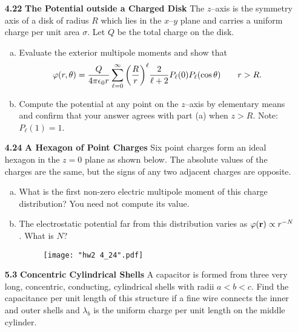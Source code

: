 \documentclass{article}
\begin{document}
\begin{enumerate}
    \item [\textbf{4.22}] \textbf{The Potential outside a Charged Disk } The $z$--axis is the symmetry axis of a disk of radius $R$ which lies in the $x$--$y$ plane and carries a uniform charge per unit area $\sigma$. Let $Q$ be the total charge on the disk.
    \begin{enumerate}[(a)]
        \item Evaluate the exterior multipole moments and show that
        \[
            \varphi(r,\theta) = \frac{Q}{4\pi\epsilon_0r}\sum_{\ell=0}^\infty \pqty{\frac{R}{r}}^\ell \frac{2}{\ell+2}P_\ell(0)P_\ell(\cos\theta)\quad\quad r>R.
        \]

        \item Compute the potential at any point on the $z$--axis by elementary means and confirm that your answer agrees with part (a) when $z>R$. Note: $P_\ell(1)=1$.
    \end{enumerate}

    \item [\textbf{4.24}] \textbf{A Hexagon of Point Charges } Six point charges form an ideal hexagon in the $z=0$ plane as shown below. The absolute values of the charges are the same, but the signs of any two adjacent charges are opposite.
    \begin{enumerate}[(a)]
        \item What is the first non-zero electric multipole moment of this charge distribution? You need not compute its value.

        \item The electrostatic potential far from this distribution varies as $\varphi(\vb{r})\propto r^{-N}$. What is $N$?
        \begin{figure}[H]
        \centering
        \texttt{[image: "hw2 4\_24".pdf]}
        \end{figure}
    \end{enumerate}

    \item [\textbf{5.3}] \textbf{Concentric Cylindrical Shells } A capacitor is formed from three very long, concentric, conducting, cylindrical shells with radii $a<b<c$. Find the capacitance per unit length of this structure if a fine wire connects the inner and outer shells and $\lambda_b$ is the uniform charge per unit length on the middle cylinder.


\end{enumerate}
\end{document}
